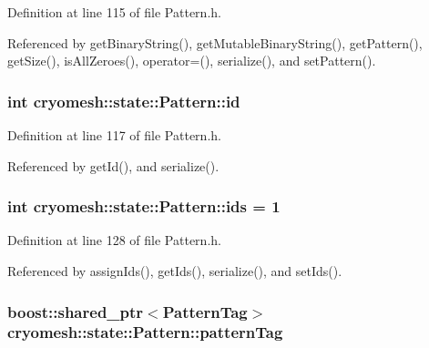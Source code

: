 \-Definition at line 115 of file \-Pattern.\-h.



\-Referenced by get\-Binary\-String(), get\-Mutable\-Binary\-String(), get\-Pattern(), get\-Size(), is\-All\-Zeroes(), operator=(), serialize(), and set\-Pattern().

\hypertarget{classcryomesh_1_1state_1_1Pattern_aa8070cf7c7e5621164fcf389baeec552}{
\subsubsection[{id}]{\setlength{\rightskip}{0pt plus 5cm}int {\bf cryomesh\-::state\-::\-Pattern\-::id}}}\label{classcryomesh_1_1state_1_1Pattern_aa8070cf7c7e5621164fcf389baeec552}


\-Definition at line 117 of file \-Pattern.\-h.



\-Referenced by get\-Id(), and serialize().

\hypertarget{classcryomesh_1_1state_1_1Pattern_a9a1488a4d6c293a0c5c5517fbcb47cb7}{
\subsubsection[{ids}]{\setlength{\rightskip}{0pt plus 5cm}int {\bf cryomesh\-::state\-::\-Pattern\-::ids} = 1}}\label{classcryomesh_1_1state_1_1Pattern_a9a1488a4d6c293a0c5c5517fbcb47cb7}


\-Definition at line 128 of file \-Pattern.\-h.



\-Referenced by assign\-Ids(), get\-Ids(), serialize(), and set\-Ids().

\hypertarget{classcryomesh_1_1state_1_1Pattern_ae6138b7407f2e55de84a1c53fcc14a35}{
\subsubsection[{pattern\-Tag}]{\setlength{\rightskip}{0pt plus 5cm}boost\-::shared\-\_\-ptr$<${\bf \-Pattern\-Tag}$>$ {\bf cryomesh\-::state\-::\-Pattern\-::pattern\-Tag}}}\label{classcryomesh_1_1state_1_1Pattern_ae6138b7407f2e55de84a1c53fcc14a35}


